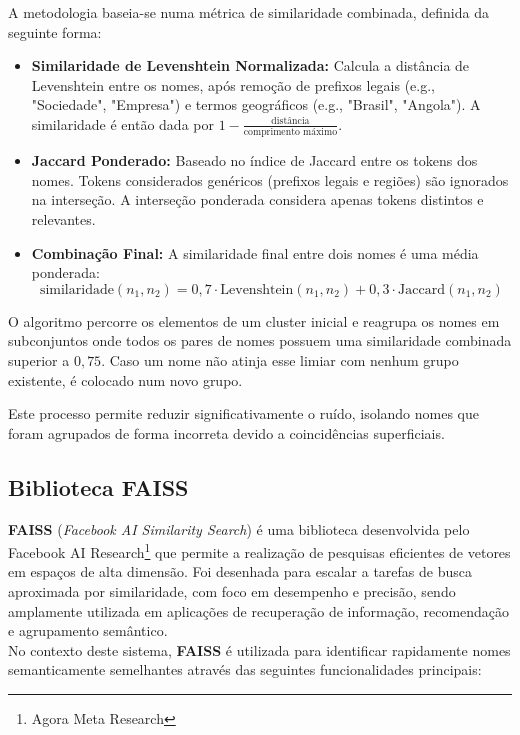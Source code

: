 \documentclass[a4paper,12pt]{article}
\begin{document}
\vspace{0.5em}
\noindent A metodologia baseia-se numa métrica de similaridade combinada, definida da seguinte forma:

\begin{itemize}
    \item \textbf{Similaridade de Levenshtein Normalizada:} Calcula a distância de Levenshtein entre os nomes, após remoção de prefixos legais (e.g., "Sociedade", "Empresa") e termos geográficos (e.g., "Brasil", "Angola"). A similaridade é então dada por $1 - \frac{\text{distância}}{\text{comprimento máximo}}$.
    
    \item \textbf{Jaccard Ponderado:} Baseado no índice de Jaccard entre os tokens dos nomes. Tokens considerados genéricos (prefixos legais e regiões) são ignorados na interseção. A interseção ponderada considera apenas tokens distintos e relevantes.
    
    \item \textbf{Combinação Final:} A similaridade final entre dois nomes é uma média ponderada: 
    \[
    \text{similaridade}(n_1, n_2) = 0{,}7 \cdot \text{Levenshtein}(n_1, n_2) + 0{,}3 \cdot \text{Jaccard}(n_1, n_2)
    \]
\end{itemize}

\vspace{0.5em}
\noindent O algoritmo percorre os elementos de um cluster inicial e reagrupa os nomes em subconjuntos onde todos os pares de nomes possuem uma similaridade combinada superior a $0{,}75$. Caso um nome não atinja esse limiar com nenhum grupo existente, é colocado num novo grupo.


\noindent Este processo permite reduzir significativamente o ruído, isolando nomes que foram agrupados de forma incorreta devido a coincidências superficiais.


\subsection{Biblioteca FAISS} \label{faiss}

\textbf{FAISS} (\textit{Facebook AI Similarity Search}) é uma biblioteca desenvolvida pelo Facebook AI Research\footnote{Agora Meta Research} que permite a realização de pesquisas eficientes de vetores em espaços de alta dimensão. Foi desenhada para escalar a tarefas de busca aproximada por similaridade, com foco em desempenho e precisão, sendo amplamente utilizada em aplicações de recuperação de informação, recomendação e agrupamento semântico.
\\
No contexto deste sistema, \textbf{FAISS} é utilizada para identificar rapidamente nomes semanticamente semelhantes através das seguintes funcionalidades principais:
\end{document}
